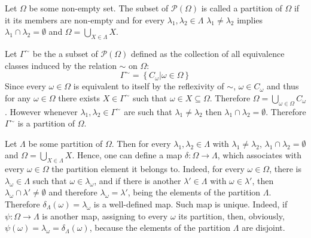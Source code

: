 \documentclass[a4paper]{article}
\newcommand{\obj}[1]{\left\{{#1}\right\}}
\newcommand{\brac}[1]{{\left({#1}\right)}}
\begin{document}
Let $\Omega$ be some non-empty set. The subset of $\mathcal{P}\brac{\Omega}$ is called a partition of $\Omega$ if it its members are non-empty and for every $\lambda_1, \lambda_2\in \Lambda$ $\lambda_1\neq \lambda_2$ implies $\lambda_1\cap \lambda_2=\emptyset$ and $\Omega = \bigcup_{X\in \Lambda} X$.

Let $\Gamma^\sim$ be the a subset of $\mathcal{P}\brac{\Omega}$ defined as the collection of all equivalence classes induced by the relation $\sim$ on $\Omega$:\[\Gamma^\sim = \obj{ C_\omega\vert \omega\in \Omega}\]
Since every $\omega\in \Omega$ is equivalent to itself by the reflexivity of $\sim$, $\omega\in C_{\omega}$ and thus for any $\omega\in \Omega$ there exists $X\in \Gamma^\sim$ such that $\omega\in X\subseteq \Omega$. Therefore $\Omega = \bigcup_{\omega\in \Omega} C_\omega$. However whenever $\lambda_1, \lambda_2\in \Gamma^\sim$ are such that $\lambda_1\neq \lambda_2$ then $\lambda_1\cap \lambda_2=\emptyset$. Therefore $\Gamma^\sim$ is a partition of $\Omega$.

Let $\Lambda$ be some partition of $\Omega$. Then for every $\lambda_1, \lambda_2\in \Lambda$ with $\lambda_1\neq \lambda_2$, $\lambda_1\cap \lambda_2=\emptyset$ and $\Omega=\bigcup_{X\in \Lambda} X$. Hence, one can define a map $\delta:\Omega\to \Lambda$, which associates with every $\omega\in \Omega$ the partition element it belongs to. Indeed, for every $\omega\in \Omega$, there is $\lambda_\omega\in \Lambda$ such that $\omega\in \lambda_\omega$, and if there is another $\lambda'\in \Lambda$ with $\omega\in \lambda'$, then $\lambda_\omega\cap \lambda'\neq \emptyset$ and therefore $\lambda_\omega=\lambda'$, being the elements of the partition $\Lambda$. Therefore $\delta_\Lambda(\omega) = \lambda_\omega$ is a well-defined map.
Such map is unique. Indeed, if $\psi:\Omega\to \Lambda$ is another map, assigning to every $\omega$ its partition, then, obviously, $\psi(\omega) = \lambda_\omega = \delta_\Lambda(\omega)$, because the elements of the partition $\Lambda$ are disjoint.
\end{document}

